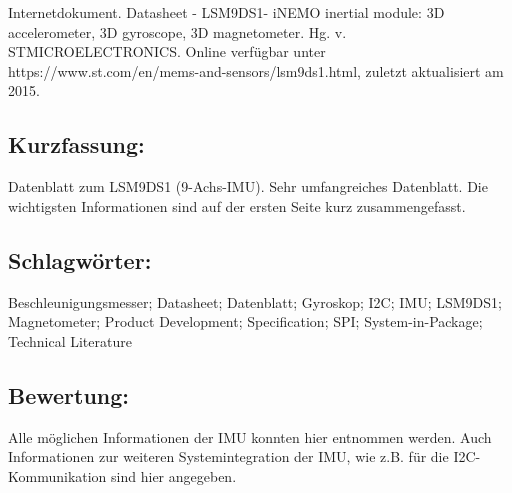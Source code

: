 \begin{minipage}{0.48\textwidth}
Internetdokument. Datasheet - LSM9DS1- iNEMO inertial module: 3D accelerometer, 3D gyroscope, 3D magnetometer.	Hg. v. STMICROELECTRONICS. Online verfügbar unter https://www.st.com/en/mems-and-sensors/lsm9ds1.html, zuletzt aktualisiert am 2015.
\subsection*{Kurzfassung:}
Datenblatt zum LSM9DS1 (9-Achs-IMU). Sehr umfangreiches Datenblatt. Die wichtigsten Informationen sind auf der ersten Seite kurz zusammengefasst.
\subsection*{Schlagwörter:}
Beschleunigungsmesser; Datasheet; Datenblatt; Gyroskop; I2C; IMU; LSM9DS1; Magnetometer; Product Development; Specification; SPI; System-in-Package; Technical Literature
\end{minipage}
\subsection*{Bewertung:}
Alle möglichen Informationen der IMU konnten hier entnommen werden. Auch Informationen zur weiteren Systemintegration der IMU, wie z.B. für die I2C-Kommunikation sind hier angegeben.

